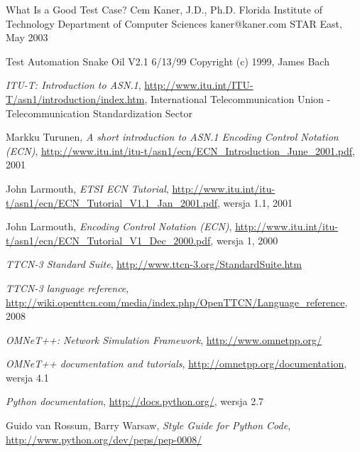 \documentclass[00-praca-magisterska.tex]{subfiles}
\begin{document}
\begin{thebibliography}{9}

What Is a Good Test Case?
Cem Kaner, J.D., Ph.D.
Florida Institute of Technology
Department of Computer Sciences
kaner@kaner.com
STAR East, May 2003

Test Automation Snake Oil
V2.1 6/13/99
Copyright (c) 1999, James Bach





  \emph{ITU-T: Introduction to ASN.1},
  \url{http://www.itu.int/ITU-T/asn1/introduction/index.htm},
  International Telecommunication Union - Telecommunication Standardization Sector

  Markku Turunen,
  \emph{A short introduction to ASN.1 Encoding Control Notation (ECN)},
  \url{http://www.itu.int/itu-t/asn1/ecn/ECN_Introduction_June_2001.pdf},
  2001

  John Larmouth,
  \emph{ETSI ECN Tutorial},
  \url{http://www.itu.int/itu-t/asn1/ecn/ECN_Tutorial_V1.1_Jan_2001.pdf},
  wersja 1.1,
  2001

  John Larmouth,
  \emph{Encoding Control Notation (ECN)},
  \url{http://www.itu.int/itu-t/asn1/ecn/ECN_Tutorial_V1_Dec_2000.pdf},
  wersja 1, 
  2000

  \emph{TTCN-3 Standard Suite},
  \url{http://www.ttcn-3.org/StandardSuite.htm}

  \emph{TTCN-3 language reference},
  \url{http://wiki.openttcn.com/media/index.php/OpenTTCN/Language_reference},
  2008

  \emph{OMNeT++: Network Simulation Framework},
  \url{http://www.omnetpp.org/}

  \emph{OMNeT++ documentation and tutorials},
  \url{http://omnetpp.org/documentation},
  wersja 4.1

  \emph{Python documentation}, 
  \url{http://docs.python.org/},
  wersja 2.7

  Guido van Rossum, Barry Warsaw,
  \emph{Style Guide for Python Code},
  \url{http://www.python.org/dev/peps/pep-0008/}


\end{thebibliography}
\end{document}
